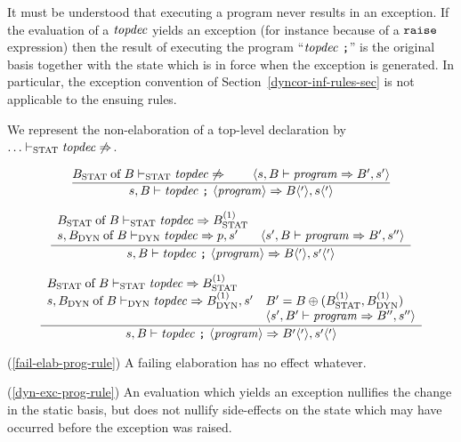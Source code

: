 It must be understood  that executing a program never results in an
exception. If the evaluation of a ${\it topdec}$ yields an exception
(for instance because of a ${\tt raise}$ expression) then
the result of executing the program ``${\it topdec}\ \mbox{{\tt ;}}$'' is the
original basis together with the state which is in force when the exception is
generated. In particular, the exception convention of
Section~\ref{dyncor-inf-rules-sec}
is not applicable to the ensuing rules.

We represent the non-elaboration of a top-level declaration by
 $\ldots\vdash_{\rm STAT}{\it topdec}\not\Rightarrow$. 

\begin{equation}            %
\label{fail-elab-prog-rule}
\frac{\of{\Bstat}{\B}\tsstat\topdec\not\ra\qquad
      \langle\s,\B\ts\program\ra\B',s'\rangle}
     {\s,\B\ts\longprog\ra\B\langle'\rangle,s\langle'\rangle}\index{65.2}
\end{equation}

\begin{equation}            %
\label{dyn-exc-prog-rule}
\frac{\begin{array}{lr}
      \of{\Bstat}{\B}\tsstat\topdec\ra\Bstat^{(1)} & \\
      \s,\of{\Bdyn}{\B}\tsdyn\topdec\ra\p,\s' &
                  \langle\s',\B\ts\program\ra\B',\s''\rangle
      \end{array}}
     {\s,\B\ts\longprog\ra\B\langle'\rangle,\s'\langle'\rangle}
\end{equation}

\begin{equation}            %
\label{success-prog-rule}
\frac{\begin{array}{ll}
       \of{\Bstat}{\B}\tsstat\topdec\ra\Bstat^{(1)} & \\
       \s,\of{\Bdyn}{\B}\tsdyn\topdec\ra\Bdyn^{(1)},s'&
                   \B'=\B\oplus(\Bstat^{(1)},\Bdyn^{(1)})\\
       &           \langle\s',\B'\ts\program\ra\B'',s''\rangle
      \end{array}
      }
      {\s,\B\ts\longprog\ra\B'\langle'\rangle,\s'\langle'\rangle}
\end{equation}
\comments
\begin{description}
\item{(\ref{fail-elab-prog-rule})}
  A failing elaboration has no effect whatever.
\item{(\ref{dyn-exc-prog-rule})}
  An evaluation which yields an exception nullifies
the change in the static basis, but does not
nullify side-effects on the state which may have occurred
before the exception was raised.
\end{description}
